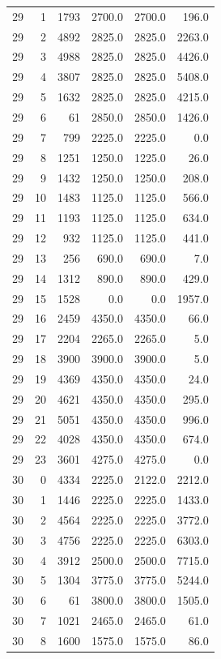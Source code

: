 \begin{longtable}{rrrrrr}
29 & 1 & 1793 & 2700.0 & 2700.0 & 196.0\\
29 & 2 & 4892 & 2825.0 & 2825.0 & 2263.0\\
29 & 3 & 4988 & 2825.0 & 2825.0 & 4426.0\\
29 & 4 & 3807 & 2825.0 & 2825.0 & 5408.0\\
29 & 5 & 1632 & 2825.0 & 2825.0 & 4215.0\\
29 & 6 & 61 & 2850.0 & 2850.0 & 1426.0\\
29 & 7 & 799 & 2225.0 & 2225.0 & 0.0\\
29 & 8 & 1251 & 1250.0 & 1225.0 & 26.0\\
29 & 9 & 1432 & 1250.0 & 1250.0 & 208.0\\
29 & 10 & 1483 & 1125.0 & 1125.0 & 566.0\\
29 & 11 & 1193 & 1125.0 & 1125.0 & 634.0\\
29 & 12 & 932 & 1125.0 & 1125.0 & 441.0\\
29 & 13 & 256 & 690.0 & 690.0 & 7.0\\
29 & 14 & 1312 & 890.0 & 890.0 & 429.0\\
29 & 15 & 1528 & 0.0 & 0.0 & 1957.0\\
29 & 16 & 2459 & 4350.0 & 4350.0 & 66.0\\
29 & 17 & 2204 & 2265.0 & 2265.0 & 5.0\\
29 & 18 & 3900 & 3900.0 & 3900.0 & 5.0\\
29 & 19 & 4369 & 4350.0 & 4350.0 & 24.0\\
29 & 20 & 4621 & 4350.0 & 4350.0 & 295.0\\
29 & 21 & 5051 & 4350.0 & 4350.0 & 996.0\\
29 & 22 & 4028 & 4350.0 & 4350.0 & 674.0\\
29 & 23 & 3601 & 4275.0 & 4275.0 & 0.0\\
30 & 0 & 4334 & 2225.0 & 2122.0 & 2212.0\\
30 & 1 & 1446 & 2225.0 & 2225.0 & 1433.0\\
30 & 2 & 4564 & 2225.0 & 2225.0 & 3772.0\\
30 & 3 & 4756 & 2225.0 & 2225.0 & 6303.0\\
30 & 4 & 3912 & 2500.0 & 2500.0 & 7715.0\\
30 & 5 & 1304 & 3775.0 & 3775.0 & 5244.0\\
30 & 6 & 61 & 3800.0 & 3800.0 & 1505.0\\
30 & 7 & 1021 & 2465.0 & 2465.0 & 61.0\\
30 & 8 & 1600 & 1575.0 & 1575.0 & 86.0\\

\end{longtable}

